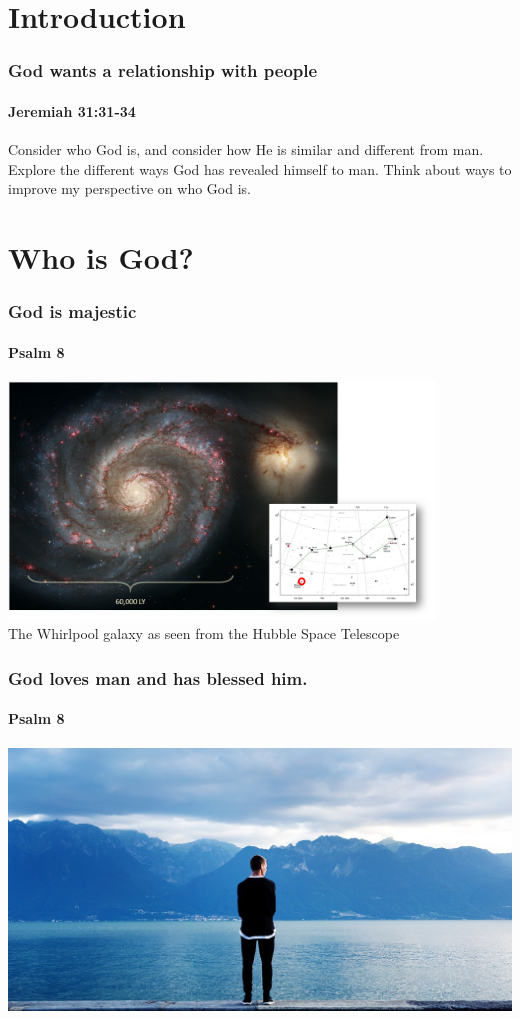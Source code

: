 
\section*{Introduction}

\begin{frame}
\frametitle{God wants a relationship with people}
\framesubtitle{Jeremiah 31:31-34}
\end{frame}

\begin{goals}
\goal Consider who God is, and consider how He is similar and different from man.
\goal Explore the different ways God has revealed himself to man.
\goal Think about ways to improve my perspective on who God is.
\end{goals}


\section{Who is God?}

\begin{frame}
\frametitle{God is majestic}
\framesubtitle{Psalm 8}
\begin{center}
	\includegraphics[width=0.85\textwidth]{figures/galaxy.png}\\
	{\footnotesize The Whirlpool galaxy as seen from the Hubble Space Telescope}
\end{center}
\end{frame}

\begin{frame}
\frametitle{God loves man and has blessed him.}
\framesubtitle{Psalm 8}
\begin{center}
	\includegraphics[width=\textwidth]{figures/manLandscape.jpg}
\end{center}
\end{frame}

